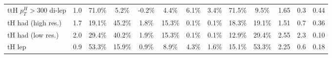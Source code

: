 \begin{table}
\begin{tabular}{lcccccccccccc}
ttH $p_{T}^{H} > 300$ di-lep & 1.0 & 71.0\% & 5.2\% & -0.2\% & 4.4\% & 6.1\% & 3.4\% & 71.5\% & 9.5\% & 1.65 & 0.3 & 0.44 \\
tH had (high res.) & 1.7 & 19.1\% & 45.2\% & 1.8\% & 15.3\% & 0.1\% & 0.1\% & 18.3\% & 19.1\% & 1.51 & 0.7 & 0.36 \\
tH had (low res.) & 2.0 & 29.4\% & 40.2\% & 1.9\% & 15.3\% & 0.1\% & 0.1\% & 12.9\% & 29.4\% & 2.55 & 2.3 & 0.10 \\
tH lep & 0.9 & 53.3\% & 15.9\% & 0.9\% & 8.9\% & 4.3\% & 1.6\% & 15.1\% & 53.3\% & 2.25 & 0.6 & 0.18 \\
\bottomrule
\end{tabular}
\end{table}
